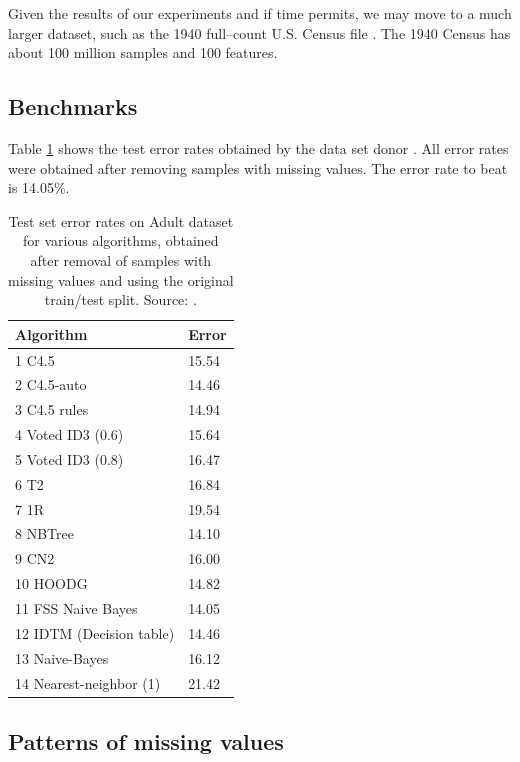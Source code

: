 \documentclass[12pt]{article}
\begin{document}
Given the results of our experiments and if time permits, we may move to a much larger dataset, such as the 1940 full--count U.S. Census file \citep{napp2008, ruggles2010}. The 1940 Census has about 100 million samples and 100 features. 

\subsection{Benchmarks}
Table \ref{benchmarks} shows the test error rates obtained by the data set donor \citep{kohavi1996}. All error rates were obtained after removing samples with missing values. The error rate to beat is 14.05\%. \\

\begin{table}[htb]
\centering
\begin{tabular}{@{}ll@{}}
\toprule
\textbf{Algorithm}       & \textbf{Error} \\ \midrule
1  C4.5                  & 15.54          \\
2  C4.5-auto             & 14.46          \\
3  C4.5 rules            & 14.94          \\
4  Voted ID3 (0.6)       & 15.64          \\
5  Voted ID3 (0.8)       & 16.47          \\
6  T2                    & 16.84          \\
7  1R                    & 19.54          \\
8  NBTree                & 14.10          \\
9  CN2                   & 16.00          \\
10 HOODG                 & 14.82          \\
11 FSS Naive Bayes       & 14.05          \\
12 IDTM (Decision table) & 14.46          \\
13 Naive-Bayes           & 16.12          \\
14 Nearest-neighbor (1)  & 21.42          \\ \bottomrule
\end{tabular}
\caption{Test set error rates on Adult dataset for various algorithms, obtained after removal of samples with missing values and using the original train/test split. Source: \citet{Lichman2013}.}
\label{benchmarks}
\end{table}

\subsection{Patterns of missing values}
\end{document}
